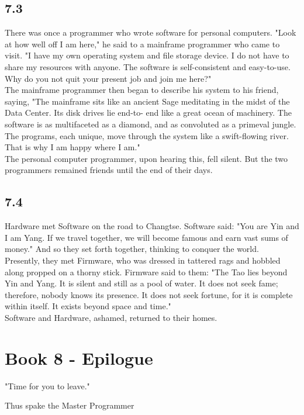 \documentclass[14pt, letterpaper]{book}
\begin{document}
\section*{7.3}
There was once a programmer who wrote software for personal computers. "Look at how well off I am here," he said to a mainframe programmer who came to visit. "I have my own operating system and file storage device. I do not have to share my resources with anyone. The software is self-consistent and easy-to-use. Why do you not quit your present job and join me here?"\\

The mainframe programmer then began to describe his system to his friend, saying, "The mainframe sits like an ancient Sage meditating in the midst of the Data Center. Its disk drives lie end-to- end like a great ocean of machinery. The software is as multifaceted as a diamond, and as convoluted as a primeval jungle. The programs, each unique, move through the system like a swift-flowing river. That is why I am happy where I am."\\

The personal computer programmer, upon hearing this, fell silent. But the two programmers remained friends until the end of their days.\\

\section*{7.4}
Hardware met Software on the road to Changtse. Software said: "You are Yin and I am Yang. If we travel together, we will become famous and earn vast sums of money." And so they set forth together, thinking to conquer the world.\\

Presently, they met Firmware, who was dressed in tattered rags and hobbled along propped on a thorny stick. Firmware said to them: "The Tao lies beyond Yin and Yang. It is silent and still as a pool of water. It does not seek fame; therefore, nobody knows its presence. It does not seek fortune, for it is complete within itself. It exists beyond space and time."\\

Software and Hardware, ashamed, returned to their homes.

\chapter*{Book 8 - Epilogue}
\epigraph{"Time for you to leave."}{Thus spake the Master Programmer}
\end{document}
